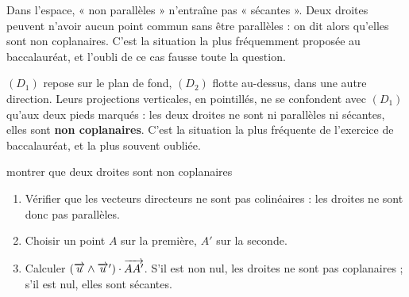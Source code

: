 \begin{avertissement}
Dans l'espace, « non parallèles » n'entraîne pas « sécantes ». Deux droites
peuvent n'avoir aucun point commun sans être parallèles : on dit alors
qu'elles sont non coplanaires. C'est la situation la plus fréquemment
proposée au baccalauréat, et l'oubli de ce cas fausse toute la question.
\end{avertissement}

\begin{visualisation}
\begin{center}
\end{center}
$(D_{1})$ repose sur le plan de fond, $(D_{2})$ flotte au-dessus, dans une
autre direction. Leurs projections verticales, en pointillés, ne se
confondent avec $(D_{1})$ qu'aux deux pieds marqués : les deux droites ne
sont ni parallèles ni sécantes, elles sont \textbf{non coplanaires}. C'est
la situation la plus fréquente de l'exercice de baccalauréat, et la plus
souvent oubliée.
\end{visualisation}

\begin{methode}{montrer que deux droites sont non coplanaires}
\begin{enumerate}[label=\textbf{\arabic*.}, leftmargin=*, itemsep=0.15em]
  \item Vérifier que les vecteurs directeurs ne sont pas colinéaires : les
        droites ne sont donc pas parallèles.
  \item Choisir un point $A$ sur la première, $A'$ sur la seconde.
  \item Calculer $\left(\overrightarrow{u} \wedge \overrightarrow{u}'\right) \cdot \overrightarrow{AA'}$. S'il
        est non nul, les droites ne sont pas coplanaires ; s'il est nul, elles
        sont sécantes.
\end{enumerate}
\end{methode}


